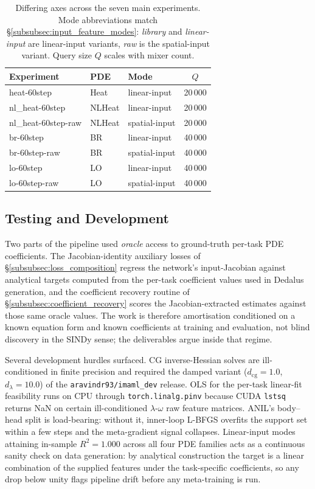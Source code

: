 \documentclass[10pt,journal,compsoc]{IEEEtran}
\begin{document}
\begin{table}[!t]
\centering
\caption{Differing axes across the seven main experiments. Mode
abbreviations match \S\ref{subsubsec:input_feature_modes}: \emph{library}
and \emph{linear-input} are linear-input variants, \emph{raw} is the
spatial-input variant. Query size $Q$ scales with mixer count.}
\label{tab:experiment_grid}
\small
\begin{tabular}{@{}lllc@{}}
\toprule
Experiment                  & PDE   & Mode       & $Q$    \\
\midrule
heat-60step                 & Heat  & linear-input& 20\,000 \\
nl\_heat-60step             & NLHeat & linear-input & 20\,000 \\
nl\_heat-60step-raw         & NLHeat & spatial-input& 20\,000 \\
br-60step                   & BR    & linear-input & 40\,000 \\
br-60step-raw               & BR    & spatial-input & 40\,000 \\
lo-60step                   & LO    & linear-input & 40\,000 \\
lo-60step-raw               & LO    & spatial-input & 40\,000 \\
\bottomrule
\end{tabular}
\end{table}

\subsection{Testing and Development}\label{subsec:testing_dev}

Two parts of the pipeline used \emph{oracle} access to ground-truth per-task
PDE coefficients. The Jacobian-identity auxiliary losses of
\S\ref{subsubsec:loss_composition} regress the network's input-Jacobian
against analytical targets computed from the per-task coefficient values
used in Dedalus generation, and the coefficient recovery routine of
\S\ref{subsubsec:coefficient_recovery} scores the Jacobian-extracted
estimates against those same oracle values. The work is therefore
amortisation conditioned on a known equation form and known coefficients
at training and evaluation, not blind discovery in the SINDy sense; the
deliverables argue inside that regime.

Several development hurdles surfaced. CG inverse-Hessian solves are
ill-conditioned in finite precision and required the damped variant
($d_{\text{cg}}{=}1.0$, $d_\lambda{=}10.0$) of the
\texttt{aravindr93/imaml\_dev} release. OLS for the per-task linear-fit
feasibility runs on CPU through \texttt{torch.linalg.pinv} because CUDA
\texttt{lstsq} returns NaN on certain ill-conditioned $\lambda$-$\omega$
raw feature matrices. ANIL's body--head split is load-bearing: without
it, inner-loop L-BFGS overfits the support set within a few steps and
the meta-gradient signal collapses. Linear-input modes attaining
in-sample $R^2 = 1.000$ across all four PDE families acts as a
continuous sanity check on data generation: by analytical construction
the target is a linear combination of the supplied features under the
task-specific coefficients, so any drop below unity flags pipeline drift
before any meta-training is run.
\end{document}
